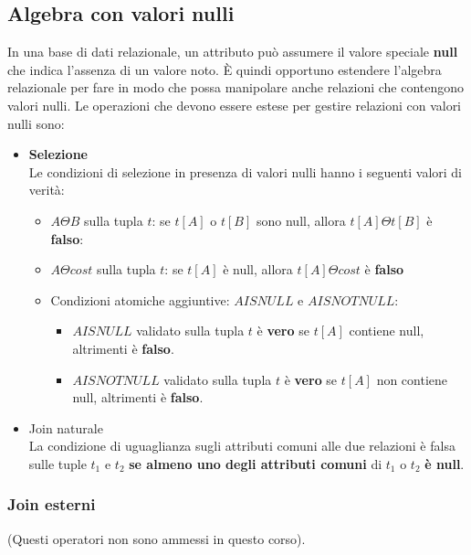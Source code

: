 \documentclass[a4paper,twoside]{article}
\begin{document}
\subsection{Algebra con valori nulli}
In una base di dati relazionale, un attributo può assumere il valore speciale
\textbf{null} che indica l'assenza di un valore noto.
È quindi opportuno estendere l'algebra relazionale per fare in modo che possa manipolare
anche relazioni che contengono valori nulli.
Le operazioni che devono essere estese per gestire relazioni con valori nulli sono:
\begin{itemize}
  \item \textbf{Selezione}\\
    Le condizioni di selezione in presenza di valori nulli hanno i seguenti valori di
    verità:
    \begin{itemize}
      \item \( A \Theta B \) sulla tupla \( t \): se \( t[A] \) o \( t[B] \) sono null,
        allora \( t[A] \Theta t[B] \) è \textbf{falso}:

      \item \( A \Theta cost \) sulla tupla \( t \): se \( t[A] \) è null, allora
        \( t[A] \Theta cost \) è \textbf{falso}

      \item Condizioni atomiche aggiuntive: \( A IS NULL \) e \( A IS NOT NULL \):
        \begin{itemize}
          \item \( A IS NULL \) validato sulla tupla \( t \) è \textbf{vero} se \( t[A] \)
            contiene null, altrimenti è \textbf{falso}.
          \item \( A IS NOT NULL \) validato sulla tupla \( t \) è \textbf{vero} se \( t[A] \)
            non contiene null, altrimenti è \textbf{falso}.
        \end{itemize}
    \end{itemize}

  \item Join naturale\\
    La condizione di uguaglianza sugli attributi comuni alle due relazioni è falsa sulle
    tuple \( t_1 \) e \( t_2 \) \textbf{se almeno uno degli attributi comuni} di
    \( t_1 \) o \( t_2 \) \textbf{è null}.
\end{itemize}

\subsubsection{Join esterni}
(Questi operatori non sono ammessi in questo corso).
\end{document}
